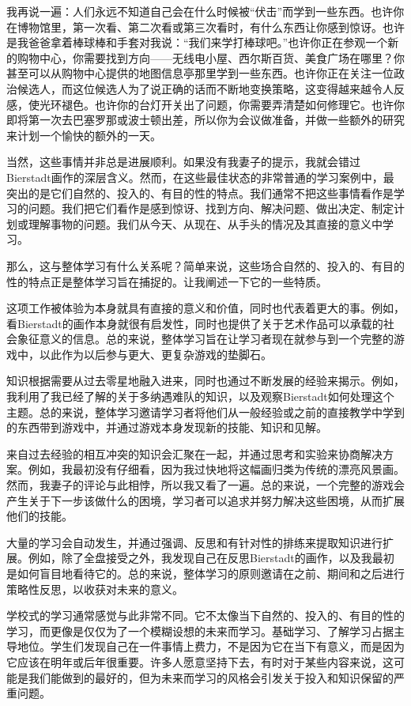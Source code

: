 我再说一遍：人们永远不知道自己会在什么时候被“伏击”而学到一些东西。也许你在博物馆里，第一次看、第二次看或第三次看时，有什么东西让你感到惊讶。也许是我爸爸拿着棒球棒和手套对我说：“我们来学打棒球吧。”也许你正在参观一个新的购物中心，你需要找到方向——无线电小屋、西尔斯百货、美食广场在哪里？你甚至可以从购物中心提供的地图信息亭那里学到一些东西。也许你正在关注一位政治候选人，而这位候选人为了说正确的话而不断地变换策略，这变得越来越令人反感，使光环褪色。也许你的台灯开关出了问题，你需要弄清楚如何修理它。也许你即将第一次去巴塞罗那或波士顿出差，所以你为会议做准备，并做一些额外的研究来计划一个愉快的额外的一天。

当然，这些事情并非总是进展顺利。如果没有我妻子的提示，我就会错过Bierstadt画作的深层含义。然而，在这些最佳状态的非常普通的学习案例中，最突出的是它们自然的、投入的、有目的性的特点。我们通常不把这些事情看作是学习的问题。我们把它们看作是感到惊讶、找到方向、解决问题、做出决定、制定计划或理解事物的问题。我们从今天、从现在、从手头的情况及其直接的意义中学习。

那么，这与整体学习有什么关系呢？简单来说，这些场合自然的、投入的、有目的性的特点正是整体学习旨在捕捉的。让我阐述一下它的一些特质。

这项工作被体验为本身就具有直接的意义和价值，同时也代表着更大的事。例如，看Bierstadt的画作本身就很有启发性，同时也提供了关于艺术作品可以承载的社会象征意义的信息。总的来说，整体学习旨在让学习者现在就参与到一个完整的游戏中，以此作为以后参与更大、更复杂游戏的垫脚石。

知识根据需要从过去零星地融入进来，同时也通过不断发展的经验来揭示。例如，我利用了我已经了解的关于多纳遇难队的知识，以及观察Bierstadt如何处理这个主题。总的来说，整体学习邀请学习者将他们从一般经验或之前的直接教学中学到的东西带到游戏中，并通过游戏本身发现新的技能、知识和见解。

来自过去经验的相互冲突的知识会汇聚在一起，并通过思考和实验来协商解决方案。例如，我最初没有仔细看，因为我过快地将这幅画归类为传统的漂亮风景画。然而，我妻子的评论与此相悖，所以我又看了一遍。总的来说，一个完整的游戏会产生关于下一步该做什么的困境，学习者可以追求并努力解决这些困境，从而扩展他们的技能。

大量的学习会自动发生，并通过强调、反思和有针对性的排练来提取知识进行扩展。例如，除了全盘接受之外，我发现自己在反思Bierstadt的画作，以及我最初是如何盲目地看待它的。总的来说，整体学习的原则邀请在之前、期间和之后进行策略性反思，以收获对未来的意义。

学校式的学习通常感觉与此非常不同。它不太像当下自然的、投入的、有目的性的学习，而更像是仅仅为了一个模糊设想的未来而学习。基础学习、了解学习占据主导地位。学生们发现自己在一件事情上费力，不是因为它在当下有意义，而是因为它应该在明年或后年很重要。许多人愿意坚持下去，有时对于某些内容来说，这可能是我们能做到的最好的，但为未来而学习的风格会引发关于投入和知识保留的严重问题。

